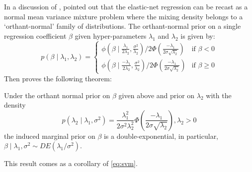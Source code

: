 \documentclass[lineno]{biometrika}
\begin{document}
\begin{remark}
In a discussion of \citet{polson2011data}, \citet{hans2011comment} pointed out that the elastic-net regression can be recast as a normal mean variance mixture problem where the mixing density belongs to a `orthant-normal' family of distributions. The orthant-normal prior on a single regression coefficient $\beta$ given hyper-parameters $\lambda_1$ and $\lambda_2$ is given by: 
\[
p (\beta \mid \lambda_1, \lambda_2)  = 
  \begin{cases} 
   \phi(\beta \mid \frac{\lambda_1}{2\lambda_2}, \frac{\sigma^2}{\lambda_2}) / 2\Phi(\frac{-\lambda_1}{2\sigma\sqrt{\lambda_2}}) & \text{if } \beta < 0 \\
   \phi(\beta \mid \frac{-\lambda_1}{2\lambda_2}, \frac{\sigma^2}{\lambda_2}) / 2\Phi(\frac{-\lambda_1}{2\sigma\sqrt{\lambda_2}})       & \text{if } \beta \geq 0
  \end{cases} \label{eq:hans}
\]
Then \citet{hans2011comment} proves the following theorem: 
\begin{theorem*}
Under the orthant normal prior on $\beta$ given above and prior on $\lambda_2$ with the density
$$
p(\lambda_2 \mid \lambda_1, \sigma^2) = \frac{\lambda_1^2}{2\sigma^2\lambda_2^2} \Phi \left( \frac{-\lambda_1}{2\sigma \sqrt{\lambda_2}} \right), \lambda_2 > 0 
$$
the induced marginal prior on $\beta$ is a double-exponential, in particular, $\beta \mid \lambda_1, \sigma^2 \sim DE(\lambda_1/\sigma^2)$.
\end{theorem*}
This result comes as a corollary of \eqref{eq:svm}. 

\end{remark}
\end{document}
